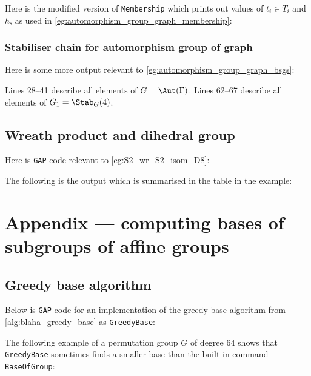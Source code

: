 

Here is the modified version of \texttt{Membership} which prints out values of $t_i \in T_i$ and $h$, as used in \autoref{eg:automorphism_group_graph_membership}:



\subsection{Stabiliser chain for automorphism group of graph}

Here is some more output relevant to \autoref{eg:automorphism_group_graph_bsgs}:\label{app:automorphism_group_graph_bsgs}



Lines 28--41 describe all elements of $G = \Aut(\Gamma)$. Lines 62--67 describe all elements of $G_1 = \Stab_G(4)$.

\section{Wreath product and dihedral group}

Here is \texttt{GAP} code relevant to \autoref{eg:S2_wr_S2_isom_D8}:



The following is the output which is summarised in the table in the example:



\chapter{Appendix --- computing bases of subgroups of affine groups}%

\section{Greedy base algorithm}

Below is \texttt{GAP} code for an implementation of the greedy base algorithm from \autoref{alg:blaha_greedy_base} as \texttt{GreedyBase}:\label{app:greedy_base}



The following example of a permutation group $G$ of degree 64 shows that \texttt{GreedyBase} sometimes finds a smaller base than the built-in command \texttt{BaseOfGroup}:\label{app:greedy_better_than_default}

